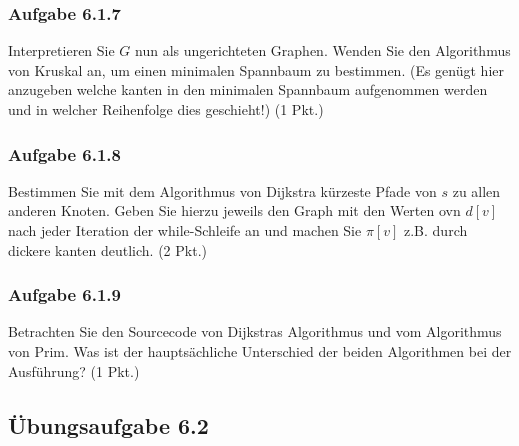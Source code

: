 \documentclass{article}
\begin{document}
\subsubsection*{Aufgabe 6.1.7}
\label{sssec:6.1.7}
Interpretieren Sie $G$ nun als ungerichteten Graphen.
Wenden Sie den Algorithmus von Kruskal an, um einen minimalen Spannbaum zu bestimmen.
(Es genügt hier anzugeben welche kanten in den minimalen Spannbaum aufgenommen werden und in welcher Reihenfolge dies geschieht!) (1 Pkt.)
\vspace{1cm}\-\\

\subsubsection*{Aufgabe 6.1.8}
\label{sssec:6.1.8}
Bestimmen Sie mit dem Algorithmus von Dijkstra kürzeste Pfade von $s$ zu allen anderen Knoten.
Geben Sie hierzu jeweils den Graph mit den Werten ovn $d[v]$ nach jeder Iteration der while-Schleife an und machen Sie $\pi[v]$ z.B. durch dickere kanten deutlich. (2 Pkt.)
\vspace{1cm}\-\\

\subsubsection*{Aufgabe 6.1.9}
\label{sssec:6.1.9}
Betrachten Sie den Sourcecode von Dijkstras Algorithmus und vom Algorithmus von Prim.
Was ist der hauptsächliche Unterschied der beiden Algorithmen bei der Ausführung? (1 Pkt.)
\vspace{1cm}\-\\

\subsection*{Übungsaufgabe 6.2}
\label{ssec:6.2}
\begin{flushright}
\begin{Large}
[~~~~\string| ~~6~]
\end{Large}
\end{flushright}
\end{document}
